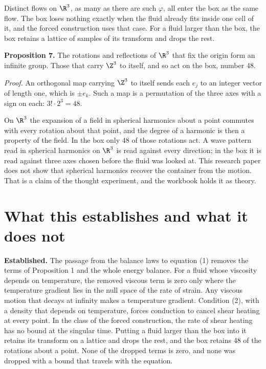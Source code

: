 Distinct flows on $\R^3$, as many as there are such $\varphi$, all enter the box as the same flow.
The box loses nothing exactly when the fluid already fits inside one cell of it, and the forced
construction uses that case. For a fluid larger than the box, the box retains a lattice of samples of
its transform and drops the rest.

\textbf{Proposition 7.} The rotations and reflections of $\R^3$ that fix the origin form an infinite
group. Those that carry $\Z^3$ to itself, and so act on the box, number 48.

\emph{Proof.} An orthogonal map carrying $\Z^3$ to itself sends each $e_j$ to an integer vector of
length one, which is $\pm e_k$. Such a map is a permutation of the three axes with a sign on each:
$3!\cdot 2^3 = 48$. \hfill\qedsymbol

On $\R^3$ the expansion of a field in spherical harmonics about a point commutes with every
rotation about that point, and the degree of a harmonic is then a property of the field. In the box only
48 of those rotations act. A wave pattern read in spherical harmonics on $\R^3$ is read against
every direction; in the box it is read against three axes chosen before the fluid was looked at.
This research paper does not show that spherical harmonics recover the container from the motion.
That is a claim of the thought experiment, and the workbook holds it as theory.

\section{What this establishes and what it does not}

\textbf{Established.} The passage from the balance laws to equation (1) removes the terms of
Proposition 1 and the whole energy balance. For a fluid whose viscosity depends on temperature,
the removed viscous term is zero only where the temperature gradient lies in the null space of the
rate of strain. Any viscous motion that decays at infinity makes a temperature gradient. Condition
(2), with a density that depends on temperature, forces conduction to cancel shear heating at every
point. In the class of the forced construction, the rate of shear heating has no bound at the
singular time. Putting a fluid larger than the box into it retains its transform on a lattice and
drops the rest, and the box retains 48 of the rotations about a point. None of the dropped terms is
zero, and none was dropped with a bound that travels
with the equation.

